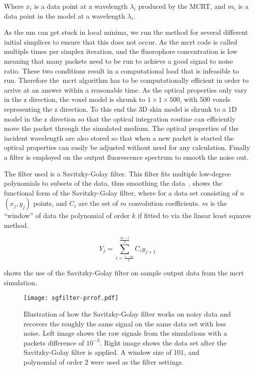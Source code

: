 Where $x_i$ is a data point at a wavelength $\lambda_i$ produced by the MCRT, and $m_i$ is a data point in the model at a wavelength $\lambda_i$.

As the \gls*{nm} can get stuck in local minima, we run the method for several different initial simplices to ensure that this does not occur.
As the \gls*{mcrt} code is called multiple times per simplex iteration, and the fluorophore concentration is low meaning that many packets need to be run to achieve a good signal to noise ratio.
These two conditions result in a computational load that is infeasible to run. 
Therefore the~\gls*{mcrt} algorithm has to be computationally efficient in order to arrive at an answer within a reasonable time.
As the optical properties only vary in the z direction, the voxel model is shrunk to $1 \times 1 \times 500$, with 500 voxels representing the z direction.
To this end the 3D skin model is shrunk to a 1D model in the z direction so that the optical integration routine can efficiently move the packet through the simulated medium.
The optical properties of the incident wavelength are also stored so that when a new packet is started the optical properties can easily be adjusted without need for any calculation.
Finally a filter is employed on the output fluorescence spectrum to smooth the noise out.

The filter used is a Savitzky-Golay filter.
This filter fits multiple low-degree polynomials to subsets of the data, thus smoothing the data~\cite{press1990savitzky}. 
 shows the functional form of the Savitzky-Golay filter, where for a data set consisting of $n$ $(x_j,y_j)$ points, and $C_i$ are the set of $m$ convolution coefficients.
$m$ is the ``window'' of data the polynomial of order $k$ if fitted to via the linear least squares method.

\begin{equation}
Y_j=\sum\limits_{i=\tfrac{1-m}{2}}^{\tfrac{m-1}{2}}C_i y_{j+1}\label{eqn:svgfiltereqn}
\end{equation}

 shows the use of the Savitzky-Golay filter on sample output data from the \gls*{mcrt} simulation.

\begin{figure}[!htbp]
  \centering
  \texttt{[image: sgfilter-prrof.pdf]}
  \caption{Illustration of how the Savitzky-Golay filter works on noisy data and recovers the roughly the same signal on the same data set with less noise. Left image shows the raw signals from the simulations with a packets difference of $10^{-3}$. Right image shows the data set after the Savitzky-Golay filter is applied. A window size of 101, and polynomial of order 2 were used as the filter settings.}
  \label{fig:sgfilter}
\end{figure}



